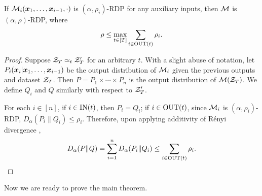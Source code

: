 \begin{lemma}
\label{lem:app:tree-mechanism:RDP-composition}
If ${\cal M}_i({\boldsymbol{x}}_1,\ldots,{\boldsymbol{x}}_{i-1},\cdot)$ is $(\alpha,\rho_i)$-RDP for any auxiliary inputs, then ${\cal M}$ is $(\alpha, \rho)$-RDP, where
\begin{equation}
    \rho \le \max_{t\in[T]} \sum_{i\in \mathrm{OUT}(t)} \rho_i.
    \label{eq:app:tree-mechanism:advanced-composition}
\end{equation}
\end{lemma}

\begin{proof}
Suppose ${\cal Z}_T\simeq_t {\cal Z}_T'$ for an arbitrary $t$. With a slight abuse of notation, let $P_i({\boldsymbol{x}}_i|{\boldsymbol{x}}_1,\ldots,{\boldsymbol{x}}_{i-1})$ be the output distribution of ${\cal M}_i$ given the previous outputs and dataset ${\cal Z}_T$. Then $P=P_1\times\dotsm\times P_n$ is the output distribution of ${\cal M}({\cal Z}_T)$. We define $Q_i$ and $Q$ similarly with respect to ${\cal Z}_T'$.

For each $i\in[n]$, if $i\in\mathrm{IN}(t)$, then $P_i=Q_i$; if $i\in\mathrm{OUT}(t)$, since ${\cal M}_i$ is $(\alpha,\rho_i)$-RDP, $D_\alpha(P_i\|Q_i)\le \rho_i$. Therefore, upon applying additivity of R\'enyi divergence \citep[Theorem 28]{mironov2017renyi},
\begin{equation*}
    D_\alpha(P \| Q) = \sum_{i=1}^n D_\alpha(P_i\|Q_i) \le \sum_{i\in\mathrm{OUT}(t)} \rho_i.
    \qedhere
\end{equation*}
\end{proof}

Now we are ready to prove the main theorem.

\ThmTreePrivacy*

